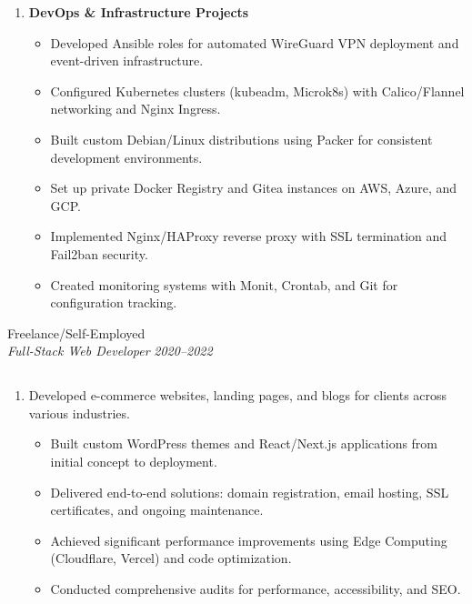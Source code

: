 \documentclass{article}
\begin{document}
\begin{enumerate}
    \item \textbf{DevOps \& Infrastructure Projects}
   \begin{itemize}
    \item Developed Ansible roles for automated WireGuard VPN deployment and event-driven infrastructure.
    \item Configured Kubernetes clusters (kubeadm, Microk8s) with Calico/Flannel networking and Nginx Ingress.
    \item Built custom Debian/Linux distributions using Packer for consistent development environments.
    \item Set up private Docker Registry and Gitea instances on AWS, Azure, and GCP.
    \item Implemented Nginx/HAProxy reverse proxy with SSL termination and Fail2ban security.
    \item Created monitoring systems with Monit, Crontab, and Git for configuration tracking.
   \end{itemize}
\end{enumerate}


\vspace{4.4em}
\vspace{0.4em}
\hspace{-2.em}
{\bf}Freelance/Self-Employed  \hfill {} \\%
{\em Full-Stack Web Developer} \hfill {\em 2020–2022} %
\subsection*{}
\vspace{1.6em}

\begin{enumerate}
    \item[] Developed e-commerce websites, landing pages, and blogs for clients across various industries.
   \begin{itemize}
    \item Built custom WordPress themes and React/Next.js applications from initial concept to deployment.
    \item Delivered end-to-end solutions: domain registration, email hosting, SSL certificates, and ongoing maintenance.
    \item Achieved significant performance improvements using Edge Computing (Cloudflare, Vercel) and code optimization.
    \item Conducted comprehensive audits for performance, accessibility, and SEO.
   \end{itemize}
\end{enumerate}
\end{document}
